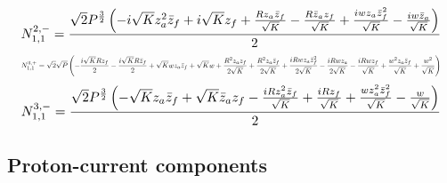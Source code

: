 \documentclass[10pt]{article}
\begin{document}
\begin{equation*}
\resizebox{0.98\textwidth}{!}{${\displaystyle N^{2,-}_{1,1}=\frac{\sqrt{2} P^{\frac{3}{2}} \left(- i \sqrt{K} z_a^{2} \bar z_f + i \sqrt{K} z_f + \frac{R z_a \bar z_f}{\sqrt{K}} - \frac{R \bar z_a z_f}{\sqrt{K}} + \frac{i w z_a \bar z_f^{2}}{\sqrt{K}} - \frac{i w \bar z_a}{\sqrt{K}}\right)}{2}}$}
\end{equation*}
\begin{equation*}
\resizebox{0.98\textwidth}{!}{${\displaystyle N^{3,+}_{1,1}=\sqrt{2} \sqrt{P} \left(- \frac{i \sqrt{K} R z_f}{2} - \frac{i \sqrt{K} R \bar z_f}{2} + \sqrt{K} w z_a \bar z_f + \sqrt{K} w + \frac{R^{2} z_a z_f}{2 \sqrt{K}} + \frac{R^{2} z_a \bar z_f}{2 \sqrt{K}} + \frac{i R w z_a \bar z_f^{2}}{2 \sqrt{K}} - \frac{i R w z_a}{2 \sqrt{K}} - \frac{i R w z_f}{\sqrt{K}} + \frac{w^{2} z_a \bar z_f}{\sqrt{K}} + \frac{w^{2}}{\sqrt{K}}\right)}$}
\end{equation*}
\begin{equation*}
\resizebox{0.98\textwidth}{!}{${\displaystyle N^{3,-}_{1,1}=\frac{\sqrt{2} P^{\frac{3}{2}} \left(- \sqrt{K} z_a \bar z_f + \sqrt{K} \bar z_a z_f - \frac{i R z_a^{2} \bar z_f}{\sqrt{K}} + \frac{i R z_f}{\sqrt{K}} + \frac{w z_a^{2} \bar z_f^{2}}{\sqrt{K}} - \frac{w}{\sqrt{K}}\right)}{2}}$}
\end{equation*}
\normalsize
\subsection*{Proton-current components}
\small
\end{document}
